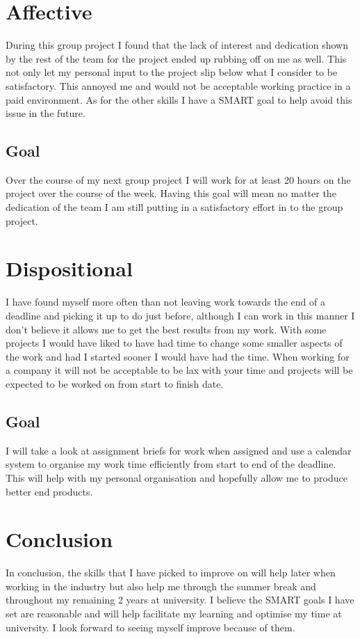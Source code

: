 \documentclass{scrartcl}
\begin{document}
\section{Affective}
During this group project I found that the lack of interest and dedication shown by the rest of the team for the project ended up rubbing off on me as well. This not only let my personal input to the project slip below what I consider to be satisfactory. This annoyed me and would not be acceptable working practice in a paid environment. As for the other skills I have a SMART goal to help avoid this issue in the future.
\subsection{Goal}
Over the course of my next group project I will work for at least 20 hours on the project over the course of the week. Having this goal will mean no matter the dedication of the team I am still putting in a satisfactory effort in to the group project.


\section{Dispositional}
I have found myself more often than not leaving work towards the end of a deadline and picking it up to do just before, although I can work in this manner I don't believe it allows me to get the best results from my work. With some projects I would have liked to have had time to change some smaller aspects of the work and had I started sooner I would have had the time. When working for a company it will not be acceptable to be lax with your time and projects will be expected to be worked on from start to finish date. 
\subsection{Goal}
I will take a look at assignment briefs for work when assigned and use a calendar system to organise my work time efficiently from start to end of the deadline. This will help with my personal organisation and hopefully allow me to produce better end products.

\section{Conclusion}
In conclusion, the skills that I have picked to improve on will help later when working in the industry but also help me through the summer break and throughout my remaining 2 years at university. I believe the SMART goals I have set are reasonable and will help facilitate my learning and optimise my time at university. I look forward to seeing myself improve because of them.
\end{document}
